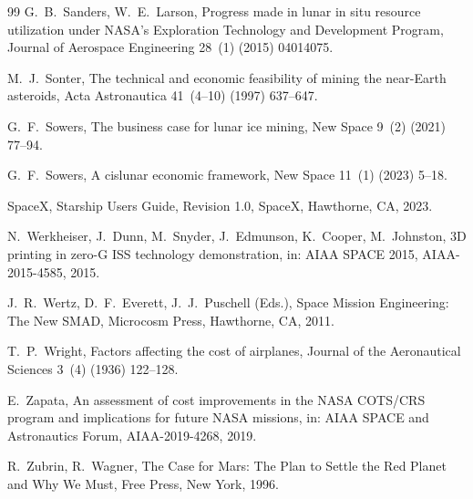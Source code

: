 \documentclass[preprint,12pt]{elsarticle}
\begin{document}
\begin{thebibliography}{99}
G.~B.~Sanders, W.~E.~Larson,
\newblock Progress made in lunar in situ resource utilization under NASA's Exploration Technology and Development Program,
\newblock Journal of Aerospace Engineering 28~(1) (2015) 04014075.

M.~J.~Sonter,
\newblock The technical and economic feasibility of mining the near-Earth asteroids,
\newblock Acta Astronautica 41~(4--10) (1997) 637--647.

G.~F.~Sowers,
\newblock The business case for lunar ice mining,
\newblock New Space 9~(2) (2021) 77--94.

G.~F.~Sowers,
\newblock A cislunar economic framework,
\newblock New Space 11~(1) (2023) 5--18.

SpaceX,
\newblock Starship Users Guide, Revision 1.0,
\newblock SpaceX, Hawthorne, CA, 2023.

N.~Werkheiser, J.~Dunn, M.~Snyder, J.~Edmunson, K.~Cooper, M.~Johnston,
\newblock 3D printing in zero-G ISS technology demonstration,
\newblock in: AIAA SPACE 2015, AIAA-2015-4585, 2015.

J.~R.~Wertz, D.~F.~Everett, J.~J.~Puschell (Eds.),
\newblock Space Mission Engineering: The New SMAD,
\newblock Microcosm Press, Hawthorne, CA, 2011.

T.~P.~Wright,
\newblock Factors affecting the cost of airplanes,
\newblock Journal of the Aeronautical Sciences 3~(4) (1936) 122--128.

E.~Zapata,
\newblock An assessment of cost improvements in the NASA COTS/CRS program and implications for future NASA missions,
\newblock in: AIAA SPACE and Astronautics Forum, AIAA-2019-4268, 2019.

R.~Zubrin, R.~Wagner,
\newblock The Case for Mars: The Plan to Settle the Red Planet and Why We Must,
\newblock Free Press, New York, 1996.

\end{thebibliography}
\end{document}
